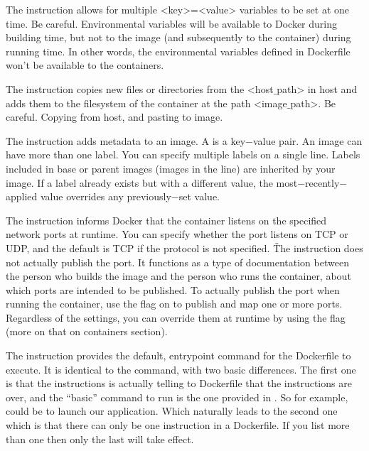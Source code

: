 The  instruction allows for multiple <key>=<value> variables to be set at one time. Be careful.
Environmental variables will be available to Docker during building time, but not to the image (and subsequently to
the container) during running time. In other words, the environmental variables defined in Dockerfile won't be
available to the containers.
\item The  instruction copies new files or directories from the <host$\_$path> in host and adds them to
the filesystem of the container at the path <image$\_$path>. Be careful. Copying from host, and pasting to image.
\item The  instruction adds metadata to an image. A  is a key$-$value pair. An image can have
more than one label. You can specify multiple labels on a single line. Labels included in base or parent images
(images in the  line) are inherited by your image. If a label already exists but with a different value,
the most$-$recently$-$applied value overrides any previously$-$set value.
\item The  instruction informs Docker that the container listens on the specified network ports at
runtime. You can specify whether the port listens on TCP or UDP, and the default is TCP if the protocol is not
specified. \v

The  instruction does not actually publish the port. It functions as a type of documentation between the
person who builds the image and the person who runs the container, about which ports are intended to be published. To
actually publish the port when running the container, use the  flag on  to publish and
map one or more ports. Regardless of the  settings, you can override them at runtime by using the
 flag (more on that on containers section).
\item The  instruction provides the default, entrypoint command for the Dockerfile to execute. It is
identical to the  command, with two basic differences. The first one is that the  instructions is
actually telling to Dockerfile that the instructions are over, and the ``basic'' command to run is the one provided
in . So for example,  could be to launch our application. Which naturally leads to the second one
which is that there can only be one  instruction in a Dockerfile. If you list more than one  then
only the last will take effect.
\eit

